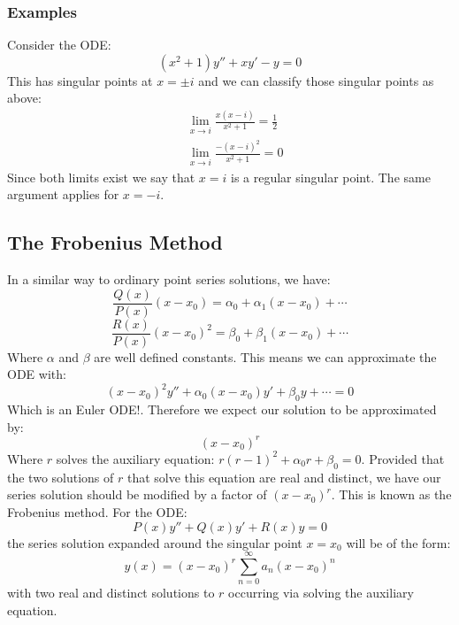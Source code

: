 \documentclass[12pt]{article}
\begin{document}
\subsubsection*{Examples}
Consider the ODE:
\[(x^2+1)y''+xy'-y=0\]
This has singular points at \(x=\pm i\) and we can classify those singular points as above:
\begin{align*}
    &\lim_{x\to i}\frac{x(x-i)}{x^2+1}=\frac{1}{2} \\
    &\lim_{x\to i}\frac{-(x-i)^2}{x^2+1}=0
\end{align*}
Since both limits exist we say that \(x=i\) is a regular singular point. The same argument applies for \(x=-i\).
\subsection{The Frobenius Method}
In a similar way to ordinary point series solutions, we have:
\[\frac{Q(x)}{P(x)}(x-x_0)=\alpha_0+\alpha_1(x-x_0)+\cdots\]
\[\frac{R(x)}{P(x)}(x-x_0)^2=\beta_0+\beta_1(x-x_0)+\cdots\]
Where \(\alpha\) and \(\beta\) are well defined constants. This means we can approximate the ODE with:
\[(x-x_0)^2y''+\alpha_0(x-x_0)y'+\beta_0y+\cdots=0\]
Which is an Euler ODE!. Therefore we expect our solution to be approximated by:
\[(x-x_0)^r\]
Where \(r\) solves the auxiliary equation: \(r(r-1)^2+\alpha_0r+\beta_0=0\). Provided that the two solutions of \(r\) that solve this equation are real and distinct, we have our series solution should be modified by a factor of \((x-x_0)^r\). This is known as the Frobenius method. For the ODE:
\[P(x)y''+Q(x)y'+R(x)y=0\]
the series solution expanded around the singular point \(x=x_0\) will be of the form:
\[y(x)=(x-x_0)^r\sum^\infty_{n=0}a_n(x-x_0)^n\]
with two real and distinct solutions to \(r\) occurring via solving the auxiliary equation.
\end{document}
